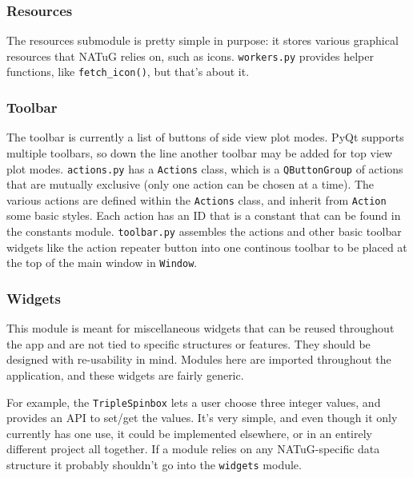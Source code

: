 \documentclass[titlepage]{article}
\begin{document}
	\subsubsection{Resources}
	The resources submodule is pretty simple in purpose: it stores various graphical resources that NATuG relies on, such as icons. \texttt{workers.py} provides helper functions, like \texttt{fetch\_icon()}, but that's about it.
	
	\subsubsection{Toolbar}
	The toolbar is currently a list of buttons of side view plot modes. PyQt supports multiple toolbars, so down the line another toolbar may be added for top view plot modes. \texttt{actions.py} has a \texttt{Actions} class, which is a \texttt{QButtonGroup} of actions that are mutually exclusive (only one action can be chosen at a time). The various actions are defined within the \texttt{Actions} class, and inherit from \texttt{Action} some basic styles. Each action has an ID that is a constant that can be found in the constants module. \texttt{toolbar.py} assembles the actions and other basic toolbar widgets like the action repeater button into one continous toolbar to be placed at the top of the main window in \texttt{Window}.
	
	\subsubsection{Widgets}
	This module is meant for miscellaneous widgets that can be reused throughout the app and are not tied to specific structures or features. They should be designed with re-usability in mind. Modules here are imported throughout the application, and these widgets are fairly generic.
	
	For example, the \texttt{TripleSpinbox} lets a user choose three integer values, and provides an API to set/get the values. It's very simple, and even though it only currently has one use, it could be implemented elsewhere, or in an entirely different project all together. If a module relies on any NATuG-specific data structure it probably shouldn't go into the \texttt{widgets} module.
	
\end{document}
